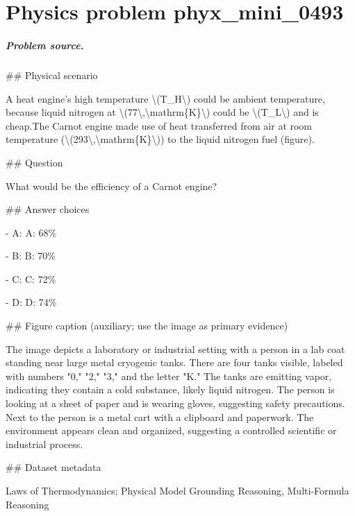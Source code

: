 
\chapter{Physics problem phyx\_mini\_0493}
\label{ch:PhyXMiniProblems_problem_phyx_mini_0493}

\paragraph{Problem source.}
\#\# Physical scenario

A heat engine's high temperature \textbackslash{}(T\_H\textbackslash{}) could be ambient temperature, because liquid nitrogen at \textbackslash{}(77\textbackslash{},\textbackslash{}mathrm\{K\}\textbackslash{}) could be \textbackslash{}(T\_L\textbackslash{}) and is cheap.The Carnot engine made use of heat transferred from air at room temperature (\textbackslash{}(293\textbackslash{},\textbackslash{}mathrm\{K\}\textbackslash{})) to the liquid nitrogen fuel (figure).

\#\# Question

What would be the efficiency of a Carnot engine?

\#\# Answer choices

- A: A: 68\%

- B: B: 70\%

- C: C: 72\%

- D: D: 74\%

\#\# Figure caption (auxiliary; use the image as primary evidence)

The image depicts a laboratory or industrial setting with a person in a lab coat standing near large metal cryogenic tanks. There are four tanks visible, labeled with numbers "0," "2," "3," and the letter "K." The tanks are emitting vapor, indicating they contain a cold substance, likely liquid nitrogen. The person is looking at a sheet of paper and is wearing gloves, suggesting safety precautions. Next to the person is a metal cart with a clipboard and paperwork. The environment appears clean and organized, suggesting a controlled scientific or industrial process.

\#\# Dataset metadata

Laws of Thermodynamics; Physical Model Grounding Reasoning, Multi-Formula Reasoning

